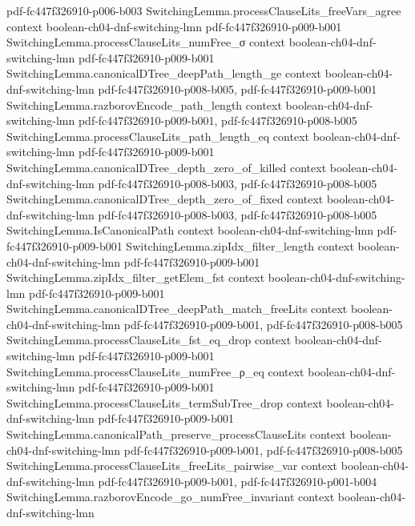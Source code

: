 \begin{theorem}
  {pdf-fc447f326910-p006-b003}
\proofstep
  {SwitchingLemma.processClauseLits_freeVars_agree}
  {context}
  {boolean-ch04-dnf-switching-lmn}
  {pdf-fc447f326910-p009-b001}
\proofstep
  {SwitchingLemma.processClauseLits_numFree_σ}
  {context}
  {boolean-ch04-dnf-switching-lmn}
  {pdf-fc447f326910-p009-b001}
\proofstep
  {SwitchingLemma.canonicalDTree_deepPath_length_ge}
  {context}
  {boolean-ch04-dnf-switching-lmn}
  {pdf-fc447f326910-p008-b005,
    pdf-fc447f326910-p009-b001}
\proofstep
  {SwitchingLemma.razborovEncode_path_length}
  {context}
  {boolean-ch04-dnf-switching-lmn}
  {pdf-fc447f326910-p009-b001,
    pdf-fc447f326910-p008-b005}
\proofstep
  {SwitchingLemma.processClauseLits_path_length_eq}
  {context}
  {boolean-ch04-dnf-switching-lmn}
  {pdf-fc447f326910-p009-b001}
\proofstep
  {SwitchingLemma.canonicalDTree_depth_zero_of_killed}
  {context}
  {boolean-ch04-dnf-switching-lmn}
  {pdf-fc447f326910-p008-b003,
    pdf-fc447f326910-p008-b005}
\proofstep
  {SwitchingLemma.canonicalDTree_depth_zero_of_fixed}
  {context}
  {boolean-ch04-dnf-switching-lmn}
  {pdf-fc447f326910-p008-b003,
    pdf-fc447f326910-p008-b005}
\proofstep
  {SwitchingLemma.IsCanonicalPath}
  {context}
  {boolean-ch04-dnf-switching-lmn}
  {pdf-fc447f326910-p009-b001}
\proofstep
  {SwitchingLemma.zipIdx_filter_length}
  {context}
  {boolean-ch04-dnf-switching-lmn}
  {pdf-fc447f326910-p009-b001}
\proofstep
  {SwitchingLemma.zipIdx_filter_getElem_fst}
  {context}
  {boolean-ch04-dnf-switching-lmn}
  {pdf-fc447f326910-p009-b001}
\proofstep
  {SwitchingLemma.canonicalDTree_deepPath_match_freeLits}
  {context}
  {boolean-ch04-dnf-switching-lmn}
  {pdf-fc447f326910-p009-b001,
    pdf-fc447f326910-p008-b005}
\proofstep
  {SwitchingLemma.processClauseLits_fst_eq_drop}
  {context}
  {boolean-ch04-dnf-switching-lmn}
  {pdf-fc447f326910-p009-b001}
\proofstep
  {SwitchingLemma.processClauseLits_numFree_ρ_eq}
  {context}
  {boolean-ch04-dnf-switching-lmn}
  {pdf-fc447f326910-p009-b001}
\proofstep
  {SwitchingLemma.processClauseLits_termSubTree_drop}
  {context}
  {boolean-ch04-dnf-switching-lmn}
  {pdf-fc447f326910-p009-b001}
\proofstep
  {SwitchingLemma.canonicalPath_preserve_processClauseLits}
  {context}
  {boolean-ch04-dnf-switching-lmn}
  {pdf-fc447f326910-p009-b001,
    pdf-fc447f326910-p008-b005}
\proofstep
  {SwitchingLemma.processClauseLits_freeLits_pairwise_var}
  {context}
  {boolean-ch04-dnf-switching-lmn}
  {pdf-fc447f326910-p009-b001,
    pdf-fc447f326910-p001-b004}
\proofstep
  {SwitchingLemma.razborovEncode_go_numFree_invariant}
  {context}
  {boolean-ch04-dnf-switching-lmn}

\end{theorem}
